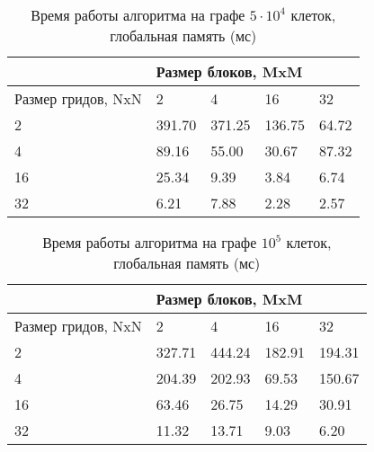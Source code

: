 \documentclass[a4paper, 12pt]{article}
\begin{document}
    \begin{table}[h!]
    \centering
\begin{tabular}{|l|llll|}
\hline
 & \multicolumn{4}{l|}{Размер блоков, MxM} \\ \hline
Размер гридов, NxN & \multicolumn{1}{l|}{2} & \multicolumn{1}{l|}{4} & \multicolumn{1}{l|}{16} & 32 \\ \hline
2 & \multicolumn{1}{l|}{391.70} & \multicolumn{1}{l|}{371.25} & \multicolumn{1}{l|}{136.75} & 64.72 \\ \hline
4 & \multicolumn{1}{l|}{89.16} & \multicolumn{1}{l|}{55.00} & \multicolumn{1}{l|}{30.67} & 87.32 \\ \hline
16 & \multicolumn{1}{l|}{25.34} & \multicolumn{1}{l|}{9.39} & \multicolumn{1}{l|}{3.84} & 6.74 \\ \hline
32 & \multicolumn{1}{l|}{6.21} & \multicolumn{1}{l|}{7.88} & \multicolumn{1}{l|}{2.28} & 2.57 \\ \hline
\end{tabular}
\caption{Время работы алгоритма на графе $5\cdot10^4$ клеток, глобальная память (мс)}
\label{tab2}
\end{table}

    \begin{table}[h!]
    \centering
\begin{tabular}{|l|llll|}
\hline
 & \multicolumn{4}{l|}{Размер блоков, MxM} \\ \hline
Размер гридов, NxN & \multicolumn{1}{l|}{2} & \multicolumn{1}{l|}{4} & \multicolumn{1}{l|}{16} & 32 \\ \hline
2 & \multicolumn{1}{l|}{327.71} & \multicolumn{1}{l|}{444.24} & \multicolumn{1}{l|}{182.91} & 194.31 \\ \hline
4 & \multicolumn{1}{l|}{204.39} & \multicolumn{1}{l|}{202.93} & \multicolumn{1}{l|}{69.53} & 150.67 \\ \hline
16 & \multicolumn{1}{l|}{63.46} & \multicolumn{1}{l|}{26.75} & \multicolumn{1}{l|}{14.29} & 30.91 \\ \hline
32 & \multicolumn{1}{l|}{11.32} & \multicolumn{1}{l|}{13.71} & \multicolumn{1}{l|}{9.03} & 6.20 \\ \hline
\end{tabular}
\caption{Время работы алгоритма на графе $10^5$ клеток, глобальная память (мс)}
\label{tab3}
\end{table}
\end{document}

